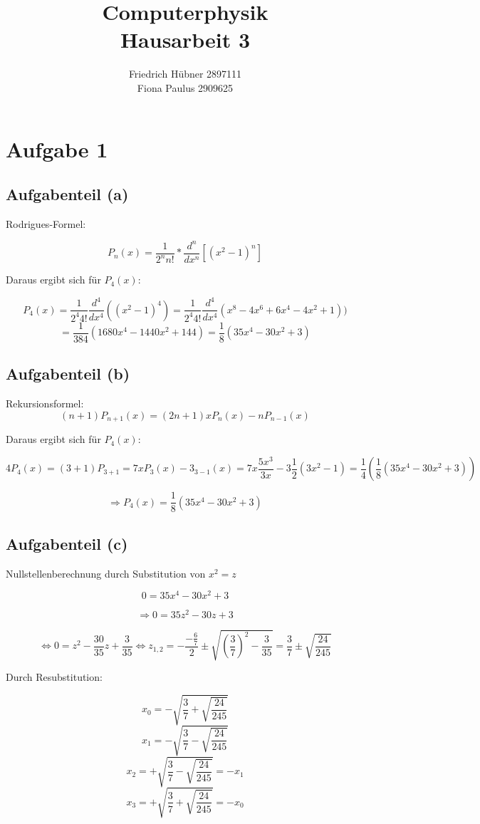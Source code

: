 \documentclass{scrreprt}
\author{Friedrich Hübner 2897111\\
Fiona Paulus 2909625}
\title{Computerphysik\\Hausarbeit 3}
\begin{document}
\maketitle
\newpage

\chapter*{Aufgabe 1}
\section*{Aufgabenteil (a)}
Rodrigues-Formel:

\[
P_n(x)= \frac{1}{2^n n!} * \frac{d^n}{dx^n} [(x^2-1)^n]
\]

Daraus ergibt sich für $P_4(x)$:

\[
P_4(x)=\frac{1}{2^4 4!} \frac{d^4}{dx^4}((x^2-1)^4) = \frac{1}{2^4 4!} \frac{d^4}{dx^4} (x^8-4x^6+6x^4-4x^2+1))
\]
\[
 = \frac{1}{384} (1680x ^4-1440x^2+144) = \frac{1}{8} (35x^4-30x^2+3)
\]

\section*{Aufgabenteil (b)}

Rekursionsformel:
\[
(n+1)P_{n+1}(x)=(2n+1)xP_n(x)-nP_{n-1}(x)
\]

Daraus ergibt sich für $P_4(x)$:

\[
4P_4(x) = (3+1)P_{3+1} = 7xP_3(x)-3_{3-1}(x)=7x \frac{5x^3}{3x}-3 \frac{1}{2}(3x^2-1) = \frac{1}{4} (\frac{1}{8}(35x^4-30x^2+3))
\]

\[
\Rightarrow P_4(x) = \frac{1}{8} (35x^4-30x^2+3)
\]

\section*{Aufgabenteil (c)}

Nullstellenberechnung durch Substitution von $x^2 = z$

\[
0=35x^4-30x^2+3
\]

\[
\Rightarrow 0=35z^2-30z+3
\]

\[
\Leftrightarrow 0 = z^2-\frac{30}{35}z+\frac{3}{35} \Leftrightarrow z_{1,2}=-\frac{-\frac{6}{7}}{2}\pm \sqrt{(\frac{3}{7})^2-\frac{3}{35}}=\frac{3}{7}\pm\sqrt{\frac{24}{245}}
\]

Durch Resubstitution:

\[
x_0 = -\sqrt{\frac{3}{7}+\sqrt{\frac{24}{245}}}
\]
\[
x_1 = -\sqrt{\frac{3}{7}-\sqrt{\frac{24}{245}}}
\]
\[
x_2 = +\sqrt{\frac{3}{7}-\sqrt{\frac{24}{245}}}=-x_1\]
\[
x_3 = +\sqrt{\frac{3}{7}+\sqrt{\frac{24}{245}}}
=-x_0\]
\end{document}
